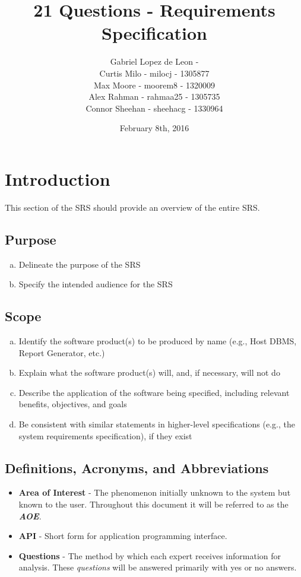 \documentclass[titlepage]{article}
\title{21 Questions - Requirements Specification}
\author{Gabriel Lopez de Leon - \\Curtis Milo - milocj - 1305877\\Max Moore - moorem8 - 1320009\\Alex Rahman - rahmaa25 - 1305735\\Connor Sheehan - sheehacg - 1330964}
\date{February 8th, 2016}
\begin{document}
\maketitle
\vspace{4cm}	
\section{Introduction}
\label{sec:introduction}

This section of the SRS should provide an overview of the entire SRS.

\subsection{Purpose}
\label{sub:purpose}
\begin{enumerate}[a)]
	\item Delineate the purpose of the SRS
	\item Specify the intended audience for the SRS
\end{enumerate}

\subsection{Scope}
\label{sub:scope}
\begin{enumerate}[a)]
	\item Identify the software product(s) to be produced by name (e.g., Host DBMS, Report Generator, etc.)
	\item Explain what the software product(s) will, and, if necessary, will not do
	\item Describe the application of the software being specified, including relevant benefits, objectives, and goals
	\item Be consistent with similar statements in higher-level specifications (e.g., the system requirements specification), if they exist
\end{enumerate}

\subsection{Definitions, Acronyms, and Abbreviations}
\label{sub:definitions_acronyms_and_abbreviations}
\begin{itemize}
	\item \textbf{Area of Interest} -
	The phenomenon initially unknown to the system but known to the user. 		Throughout this document it will be referred to as the \textit{\textbf{AOE}}.
	\item \textbf{API} - Short form for application programming interface.
	\item \textbf{Questions} - The method by which each expert receives information for analysis. These \textit{questions} will be answered primarily with yes or no answers.
\end{itemize}
\end{document}
